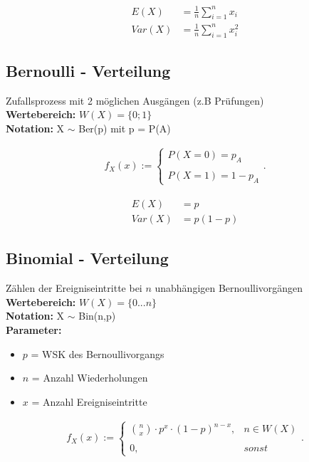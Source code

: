 \documentclass[10pt,a4paper]{article}
\begin{document}
  \begin{mdframed}[style=exercise]
    \begin{align}
        E(X) &= \frac{1}{n} \sum_{i=1}^n x_i \\
        Var(X) &= \frac{1}{n} \sum_{i=1}^n x_i^2 
    \end{align}
  \end{mdframed}

\subsection{Bernoulli - Verteilung}
Zufallsprozess mit 2 möglichen Ausgängen (z.B Prüfungen) \\
\textbf{Wertebereich:} $W(X)= \{0;1 \}$\\
\textbf{Notation:} X $\sim$ Ber(p) mit p = P(A) 
  \begin{mdframed}[style=exercise]
    \begin{align}
        f_X(x):=\left\{\begin{array}{ll} P(X=0) = p_A \\ \\
         P(X=1) = 1-p_A \end{array}\right. .
    \end{align}
  \end{mdframed}

  \begin{mdframed}[style=exercise]
    \begin{align}
        E(X) &= p \\
        Var(X) &= p(1-p) 
    \end{align}
  \end{mdframed}

\subsection{Binomial - Verteilung}
Zählen der Ereigniseintritte bei $n$ unabhängigen Bernoullivorgängen \\
\textbf{Wertebereich:} $W(X)= \{0 ... n \}$\\
\textbf{Notation:} X $\sim$ Bin(n,p) \\
\textbf{Parameter:} \begin{itemize}
    \item $p$ = WSK des Bernoullivorgangs 
    \item $n$ = Anzahl Wiederholungen 
    \item $x$ = Anzahl Ereigniseintritte 
\end{itemize}
  \begin{mdframed}[style=exercise]
    \begin{align}
        f_X(x):=\left\{\begin{array}{ll} \binom{n}{x} \cdot p^x \cdot (1-p)^{n-x}, & n \in W(X) \\ \\
        0, & sonst \end{array}\right. .
    \end{align}
  \end{mdframed}
\end{document}

